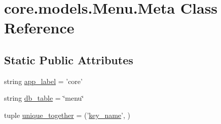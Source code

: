 \hypertarget{classcore_1_1models_1_1Menu_1_1Meta}{\section{core.\-models.\-Menu.\-Meta Class Reference}
\label{classcore_1_1models_1_1Menu_1_1Meta}
}
\subsection*{Static Public Attributes}
\begin{DoxyCompactItemize}
\item 
string \hyperlink{classcore_1_1models_1_1Menu_1_1Meta_a4089d7260846eaa663415d91839cbd07}{app\-\_\-label} = 'core'
\item 
string \hyperlink{classcore_1_1models_1_1Menu_1_1Meta_ae37629c74181c6f94c7e5fd523c7527a}{db\-\_\-table} = \char`\"{}menu\char`\"{}
\item 
tuple \hyperlink{classcore_1_1models_1_1Menu_1_1Meta_a36d296a64f7041e3655f655aef2b865c}{unique\-\_\-together} = ('\hyperlink{classcore_1_1models_1_1Menu_a68d1ce76cccad9def97d24afe21ad728}{key\-\_\-name}', )
\end{DoxyCompactItemize}


